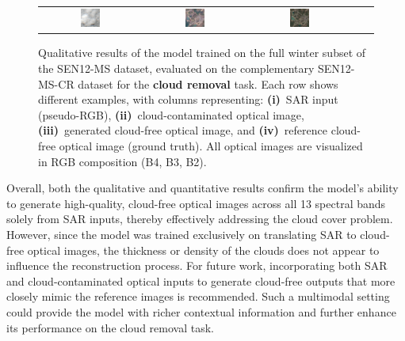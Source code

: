 \begin{figure}[h!]
\begin{tabular}{c *{4}{c}}
        \includegraphics[width=0.2\textwidth, height=0.2\textheight, keepaspectratio]{img/cloud_removal/sample_000150_cloudy_rgb.png} &
        \includegraphics[width=0.2\textwidth, height=0.2\textheight, keepaspectratio]{img/cloud_removal/sample_000150_pred_rgb.png} &
        \includegraphics[width=0.2\textwidth, height=0.2\textheight, keepaspectratio]{img/cloud_removal/sample_000150_true_rgb.png} \\
    \end{tabular}

    \caption[Qualitative results on cloud removal]{%
    Qualitative results of the model trained on the full winter subset of the SEN12-MS dataset, evaluated on the complementary SEN12-MS-CR dataset for the \textbf{cloud removal} task.  
    Each row shows different examples, with columns representing: 
    \textbf{(i)}~SAR input (pseudo-RGB), 
    \textbf{(ii)}~cloud-contaminated optical image, 
    \textbf{(iii)}~generated cloud-free optical image, and 
    \textbf{(iv)}~reference cloud-free optical image (ground truth).  
    All optical images are visualized in RGB composition (B4, B3, B2).}
    \label{fig:qualitative_results_cloud_removal}
\end{figure}

Overall, both the qualitative and quantitative results confirm the model’s ability to generate high-quality, cloud-free optical images across all 13 spectral bands solely from SAR inputs, thereby effectively addressing the cloud cover problem. However, since the model was trained exclusively on translating SAR to cloud-free optical images, the thickness or density of the clouds does not appear to influence the reconstruction process. For future work, incorporating both SAR and cloud-contaminated optical inputs to generate cloud-free outputs that more closely mimic the reference images is recommended. Such a multimodal setting could provide the model with richer contextual information and further enhance its performance on the cloud removal task.
